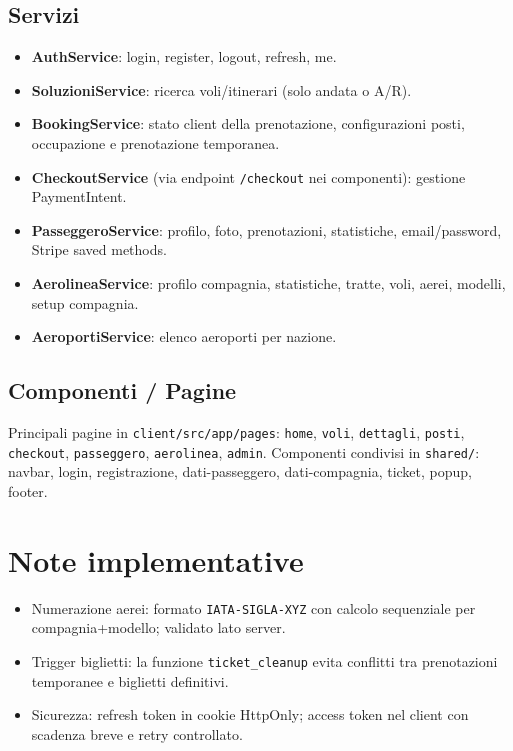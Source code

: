 \documentclass[11pt,a4paper]{article}
\begin{document}
\subsection{Servizi}
\begin{itemize}
  \item \textbf{AuthService}: login, register, logout, refresh, me.
  \item \textbf{SoluzioniService}: ricerca voli/itinerari (solo andata o A/R).
  \item \textbf{BookingService}: stato client della prenotazione, configurazioni posti, occupazione e prenotazione temporanea.
  \item \textbf{CheckoutService} (via endpoint \texttt{/checkout} nei componenti): gestione PaymentIntent.
  \item \textbf{PasseggeroService}: profilo, foto, prenotazioni, statistiche, email/password, Stripe saved methods.
  \item \textbf{AerolineaService}: profilo compagnia, statistiche, tratte, voli, aerei, modelli, setup compagnia.
  \item \textbf{AeroportiService}: elenco aeroporti per nazione.
\end{itemize}

\subsection{Componenti / Pagine}
Principali pagine in \texttt{client/src/app/pages}: \texttt{home}, \texttt{voli}, \texttt{dettagli}, \texttt{posti}, \texttt{checkout}, \texttt{passeggero}, \texttt{aerolinea}, \texttt{admin}. Componenti condivisi in \texttt{shared/}: navbar, login, registrazione, dati-passeggero, dati-compagnia, ticket, popup, footer.

\section{Note implementative}
\begin{itemize}
  \item Numerazione aerei: formato \texttt{IATA-SIGLA-XYZ} con calcolo sequenziale per compagnia+modello; validato lato server.
  \item Trigger biglietti: la funzione \texttt{ticket\_cleanup} evita conflitti tra prenotazioni temporanee e biglietti definitivi.
  \item Sicurezza: refresh token in cookie HttpOnly; access token nel client con scadenza breve e retry controllato.
\end{itemize}
\end{document}
